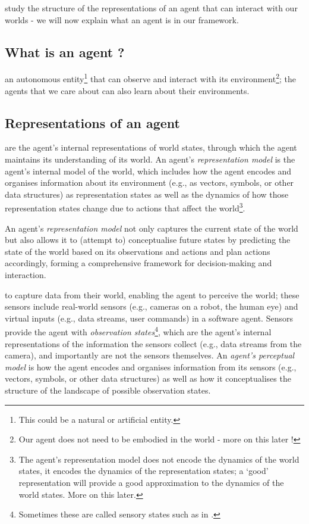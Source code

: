  study the structure of the representations of an agent that can interact with our worlds - we will now explain what an agent is in our framework.

\subsection{What is an agent ?}

 an autonomous entity\footnote{This could be a natural or artificial entity.} that can observe and interact with its environment\footnote{Our agent does not need to be embodied in the world - more on this later !}; the agents that we care about can also learn about their environments.

\subsection{Representations of an agent}

 are the agent's internal representations of world states, through which the agent maintains its understanding of its world.
An agent's \emph{representation model} is the agent's internal model of the world, which includes how the agent encodes and organises information about its environment (e.g., as vectors, symbols, or other data structures) as representation states as well as the dynamics of how those representation states change due to actions that affect the world\footnote{The agent's representation model does not encode the dynamics of the world states, it encodes the dynamics of the representation states; a `good' representation will provide a good approximation to the dynamics of the world states. More on this later.}.

An agent's \emph{representation model} not only captures the current state of the world but also allows it to (attempt to) conceptualise future states by predicting the state of the world based on its observations and actions and plan actions accordingly, forming a comprehensive framework for decision-making and interaction.

 to capture data from their world, enabling the agent to perceive the world; these sensors include real-world sensors (e.g., cameras on a robot, the human eye) and virtual inputs (e.g., data streams, user commands) in a software agent.
Sensors provide the agent with \emph{observation states}\footnote{Sometimes these are called sensory states such as in \cite{Ramstead2020}.}, which are the agent's internal representations of the information the sensors collect (e.g., data streams from the camera), and importantly are not the sensors themselves.
An \emph{agent's perceptual model} is how the agent encodes and organises information from its sensors (e.g., vectors, symbols, or other data structures) as well as how it conceptualises the structure of the landscape of possible observation states.

